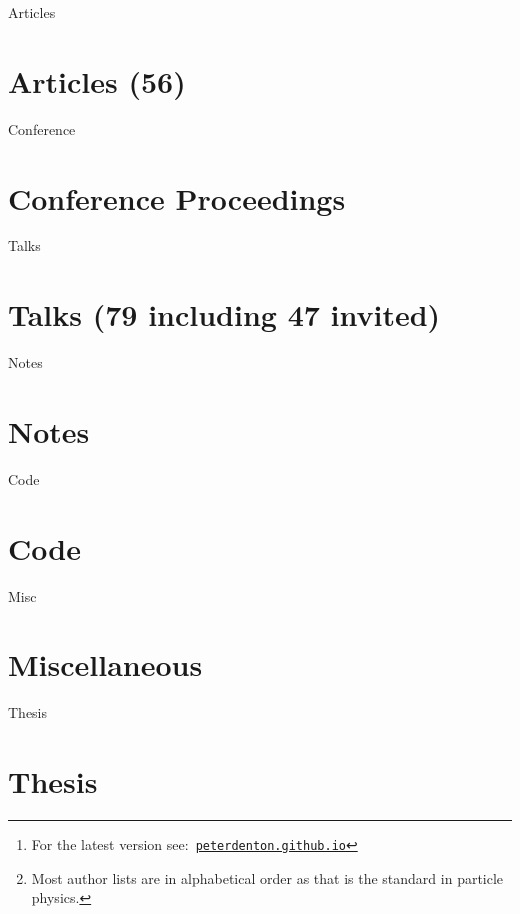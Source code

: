 \documentclass[12pt]{article}
\title{\myTitle}
\author{\myName}
\date{\small Updated: \today\footnote{For the latest version see:\ \href{http://peterdenton.github.io}{\tt peterdenton.github.io}} \footnote{Most author lists are in alphabetical order as that is the standard in particle physics.}}
\newcommand\myBib[2]{
\begin{btSect}{#2}
\section*{#1}
\btPrintAll
\end{btSect}}
\begin{document}

\maketitle



\myBib{Articles (56)}{Articles}
\myBib{Conference Proceedings}{Conference}
\myBib{Talks (79 including 47 invited)}{Talks}
\myBib{Notes}{Notes}
\myBib{Code}{Code}
\myBib{Miscellaneous}{Misc}
\myBib{Thesis}{Thesis}
\end{document}
